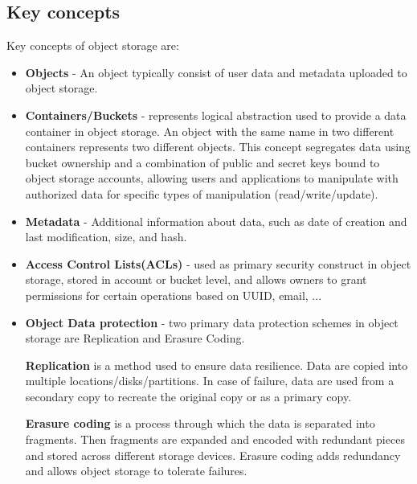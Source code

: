     \subsection*{Key concepts}
    Key concepts of object storage are\cite{ibmObjectStorage}:
    \begin{itemize}
        \item \textbf{Objects} - An object typically consist of user data and metadata uploaded to object storage.
        \item \textbf{Containers/Buckets} - represents logical abstraction used to provide a data container in object storage. An object with the same name in two different containers represents two different objects. This concept segregates data using bucket ownership and a combination of public and secret keys bound to object storage accounts, allowing users and applications to manipulate with authorized data for specific types of manipulation (read/write/update).
        \item \textbf{Metadata} - Additional information about data, such as date of creation and last modification, size, and hash.
        \item \textbf{Access Control Lists(ACLs)} - used as primary security construct in object storage, stored in account or bucket level, and allows owners to grant permissions for certain operations based on UUID, email, ...
        \item \textbf{Object Data protection} - two primary data protection schemes in object storage are Replication and Erasure Coding.

        \textbf{Replication} is a method used to ensure data resilience. Data are copied into multiple locations/disks/partitions. In case of failure, data are used from a secondary copy to recreate the original copy or as a primary copy.

        \textbf{Erasure coding} is a process through which the data is separated into fragments. Then fragments are expanded and encoded with redundant pieces and stored across different storage devices. Erasure coding adds redundancy and allows object storage to tolerate failures.
    \end{itemize}


